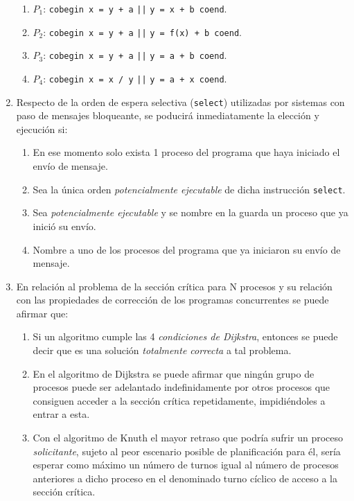 \documentclass[12pt]{article}
\begin{document}
\begin{ejercicio}
\begin{enumerate}
                \begin{enumerate}[label=(\alph*)]
                    \item $P_1$: \verb|cobegin x = y + a| \verb+||+ \verb|y = x + b coend|.
                    \item $P_2$: \verb|cobegin x = y + a| \verb+||+ \verb|y = f(x) + b coend|.
                    \item $P_3$: \verb|cobegin x = y + a| \verb+||+ \verb|y = a + b coend|.
                    \item $P_4$: \verb|cobegin x = x / y| \verb+||+ \verb|y = a + x coend|.
                \end{enumerate}
            \item Respecto de la orden de espera selectiva (\verb|select|) utilizadas por sistemas con paso de mensajes bloqueante, se poducirá inmediatamente la elección y ejecución si:
                \begin{enumerate}[label=(\alph*)]
                    \item En ese momento solo exista 1 proceso del programa que haya iniciado el envío de mensaje.
                    \item Sea la única orden \textit{potencialmente ejecutable} de dicha instrucción \verb|select|.
                    \item Sea \textit{potencialmente ejecutable} y se nombre en la guarda un proceso que ya inició su envío.
                    \item Nombre a uno de los procesos del programa que ya iniciaron su envío de mensaje.
                \end{enumerate}
            \item En relación al problema de la sección crítica para N procesos y su relación con las propiedades de corrección de los programas concurrentes se puede afirmar que:
                \begin{enumerate}[label=(\alph*)]
                    \item Si un algoritmo cumple las 4 \textit{condiciones de Dijkstra}, entonces se puede decir que es una solución \textit{totalmente correcta} a tal problema.
                    \item En el algoritmo de Dijkstra se puede afirmar que ningún grupo de procesos puede ser adelantado indefinidamente por otros procesos que consiguen acceder a la sección crítica repetidamente, impidiéndoles a entrar a esta.
                    \item Con el algoritmo de Knuth el mayor retraso que podría sufrir un proceso \textit{solicitante}, sujeto al peor escenario posible de planificación para él, sería esperar como máximo un número de turnos igual al número de procesos anteriores a dicho proceso en el denominado turno cíclico de acceso a la sección crítica.

\end{enumerate}
\end{enumerate}
\end{ejercicio}
\end{document}

